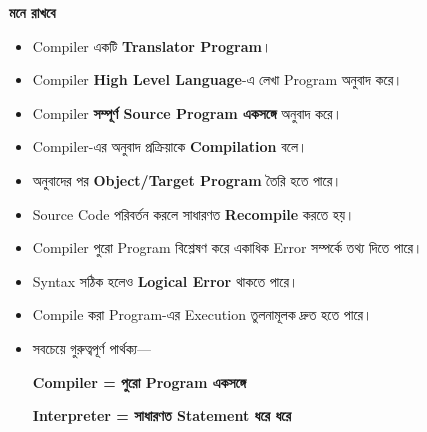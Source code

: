 \begin{rememberbox}

\textbf{\color{deepOrange}মনে রাখবে}

\begin{itemize}

\item Compiler একটি \textbf{Translator Program}।

\item Compiler \textbf{High Level Language}-এ লেখা Program অনুবাদ করে।

\item Compiler \textbf{সম্পূর্ণ Source Program একসঙ্গে} অনুবাদ করে।

\item Compiler-এর অনুবাদ প্রক্রিয়াকে
\textbf{Compilation} বলে।

\item অনুবাদের পর \textbf{Object/Target Program} তৈরি হতে পারে।

\item Source Code পরিবর্তন করলে সাধারণত
\textbf{Recompile} করতে হয়।

\item Compiler পুরো Program বিশ্লেষণ করে একাধিক Error সম্পর্কে
তথ্য দিতে পারে।

\item Syntax সঠিক হলেও \textbf{Logical Error} থাকতে পারে।

\item Compile করা Program-এর Execution তুলনামূলক দ্রুত হতে পারে।

\item সবচেয়ে গুরুত্বপূর্ণ পার্থক্য—

\begin{center}

\textbf{
Compiler = পুরো Program একসঙ্গে
}

\textbf{
Interpreter = সাধারণত Statement ধরে ধরে
}

\end{center}

\end{itemize}

\end{rememberbox}

\small

